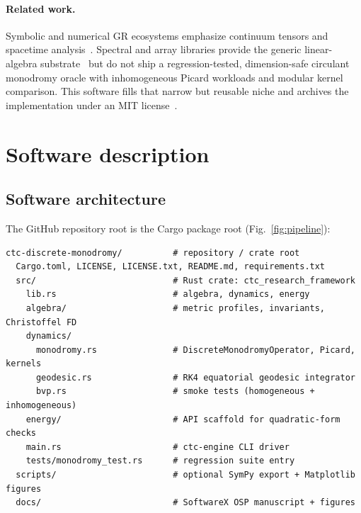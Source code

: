 \documentclass[preprint,12pt,a4paper]{elsarticle}
\begin{document}
\paragraph{Related work.}
Symbolic and numerical GR ecosystems emphasize continuum tensors and spacetime analysis~\cite{Meurer2017,Bapat2019,SageManifolds,BaumgarteShapiro2010}.
Spectral and array libraries provide the generic linear-algebra substrate~\cite{Trefethen2000,Harris2020,Virtanen2020} but do not ship a regression-tested, dimension-safe circulant monodromy oracle with inhomogeneous Picard workloads and modular kernel comparison.
This software fills that narrow but reusable niche and archives the implementation under an MIT license~\cite{PaniaguaRamirez2026CTC}.

\section{Software description}
\label{sec:software}

\subsection{Software architecture}
\label{sec:architecture}

The GitHub repository root is the Cargo package root (Fig.~\ref{fig:pipeline}):

\begin{lstlisting}[language={}]
ctc-discrete-monodromy/          # repository / crate root
  Cargo.toml, LICENSE, LICENSE.txt, README.md, requirements.txt
  src/                           # Rust crate: ctc_research_framework
    lib.rs                       # algebra, dynamics, energy
    algebra/                     # metric profiles, invariants, Christoffel FD
    dynamics/
      monodromy.rs               # DiscreteMonodromyOperator, Picard, kernels
      geodesic.rs                # RK4 equatorial geodesic integrator
      bvp.rs                     # smoke tests (homogeneous + inhomogeneous)
    energy/                      # API scaffold for quadratic-form checks
    main.rs                      # ctc-engine CLI driver
    tests/monodromy_test.rs      # regression suite entry
  scripts/                       # optional SymPy export + Matplotlib figures
  docs/                          # SoftwareX OSP manuscript + figures
\end{lstlisting}
\end{document}

